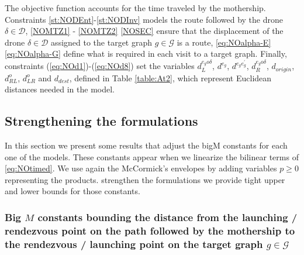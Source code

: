 \noindent
The objective function accounts for the time traveled by the mothership. Constraints \eqref{st:NODEnt}-\eqref{st:NODInv} models the route followed by the drone $\delta\in\mathcal D$, \eqref{NOMTZ1} - \eqref{NOMTZ2}  \eqref{NOSEC} ensure that the displacement of the drone $\delta\in\mathcal D$ assigned to the target graph $g\in\mathcal G$ is a route, \eqref{eq:NOalpha-E}  \eqref{eq:NOalpha-G} define what is required in each visit to a target graph. Finally, constraints (\ref{eq:NOd1})-(\ref{eq:NOd8}) set the variables $d_L^{e_go\delta}$, $d^{e_g}$, $d^{e_ge^\prime_g}$, $d_R^{e_go\delta}$, $d_{origin}$, $d_{RL}^o$, $d_{LR}^o$ and $d_{dest}$, defined in Table \ref{table:At2}, which represent Euclidean distances needed in the model. \\

\subsection*{Strengthening the formulations}
\noindent
In this section\RE{,} we present some results that adjust the bigM constants for each one of the models. These constants appear when we linearize the bilinear terms of \eqref{eq:NOtimed}. We use again the McCormick's envelopes by adding variables $p\geq 0$  representing the products.  strengthen the formulations\RE{,} we provide tight upper and lower bounds for those constants.  




\subsubsection*{Big $M$ constants bounding the distance from the launching / rendezvous point on the path followed by the mothership to the rendezvous / launching point on the target graph $g\in \mathcal{G}$}

